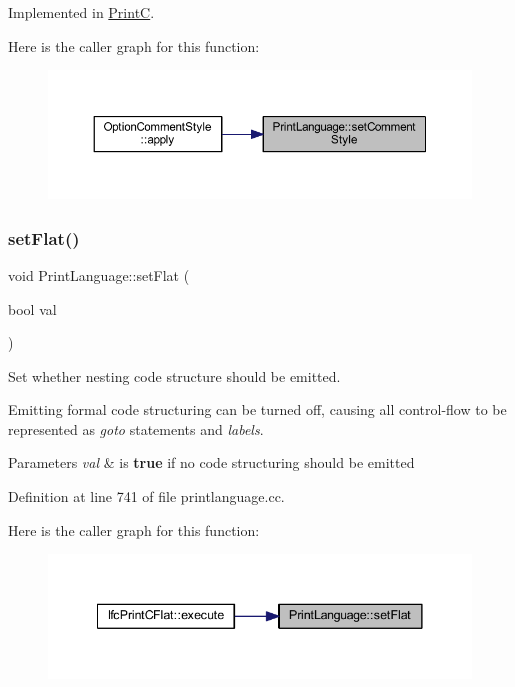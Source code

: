 Implemented in \mbox{\hyperlink{class_print_c_a8798b0408fa3386c91f9df92f63cbd15}{PrintC}}.

Here is the caller graph for this function\+:
\nopagebreak
\begin{figure}[H]
\begin{center}
\leavevmode
\includegraphics[width=350pt]{class_print_language_aa9f7b4fbc646531cfe3f9ad571f04ab1_icgraph}
\end{center}
\end{figure}
\mbox{\label{class_print_language_ae42187493b3b0458b84868ad55104f50}} 
\subsubsection{\texorpdfstring{setFlat()}{setFlat()}}
{\footnotesize\ttfamily void Print\+Language\+::set\+Flat (\begin{DoxyParamCaption}\item[{bool}]{val }\end{DoxyParamCaption})}



Set whether nesting code structure should be emitted. 

Emitting formal code structuring can be turned off, causing all control-\/flow to be represented as {\itshape goto} statements and {\itshape labels}. 
\begin{DoxyParams}{Parameters}
{\em val} & is {\bfseries{true}} if no code structuring should be emitted \\
\hline
\end{DoxyParams}


Definition at line 741 of file printlanguage.\+cc.

Here is the caller graph for this function\+:
\nopagebreak
\begin{figure}[H]
\begin{center}
\leavevmode
\includegraphics[width=341pt]{class_print_language_ae42187493b3b0458b84868ad55104f50_icgraph}
\end{center}
\end{figure}
\mbox{\label{class_print_language_a13a95cf52caabc9800a69e0a2bf90332}} 
